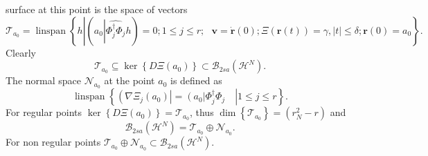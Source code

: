 \documentclass[aps,preprint]{revtex4}%
\begin{document}
surface at this point is the space of vectors
\begin{equation}
\mathcal{T}_{a_{0}}=\operatorname{linspan}\left\{  h\left\vert \left(
a_{0}\left\vert \widehat{\Phi_{j}^{\dagger}\Phi_{j}}\right.  h\right)
=0\right.  ;1\leq j\leq r;\text{ }\mathbf{v=\dot{r}}\left(  0\right)
;\Xi\left(  \mathbf{r}\left(  t\right)  \right)  =\gamma,\left\vert
t\right\vert \leq\delta;\mathbf{r}\left(  0\right)  =a_{0}\right\}  .
\end{equation}
Clearly
\begin{equation}
\mathcal{T}_{a_{0}}\subseteq\ker\left\{  D\Xi\left(  a_{0}\right)  \right\}
\subset\mathcal{B}_{2sa}\left(  \mathcal{H}^{N}\right)  .
\end{equation}
The normal space $\mathcal{N}_{a_{0}}$ at the point $a_{0}$ is defined as
\begin{equation}
\operatorname{linspan}\left\{  \left.  \left(  \overset{}{\nabla\Xi_{j}\left(
a_{0}\right)  }\right\vert =\left(  \overset{}{a_{0}}\right\vert \Phi
_{j}^{\dagger}\Phi_{j}\quad\right\vert 1\leq j\leq r\right\}  .
\end{equation}
For regular points $\ker\left\{  D\Xi\left(  a_{0}\right)  \right\}
=\mathcal{T}_{a_{0}}$, thus $\dim\left\{  \mathcal{T}_{a_{0}}\right\}
=\left(  r_{N}^{2}-r\right)  $ and
\begin{equation}
\mathcal{B}_{2sa}\left(  \mathcal{H}^{N}\right)  =\mathcal{T}_{a_{0}}%
\oplus\mathcal{N}_{a_{0}}.
\end{equation}
For non regular points $\mathcal{T}_{a_{0}}\oplus\mathcal{N}_{a_{0}}%
\subset\mathcal{B}_{2sa}\left(  \mathcal{H}^{N}\right)  .$
\end{document}
